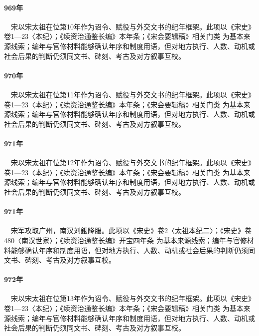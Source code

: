 \paragraph{969年}　宋以宋太祖在位第10年作为诏令、赋役与外交文书的纪年框架。此项以《宋史》卷1—23〈本纪〉；《续资治通鉴长编》本年条；《宋会要辑稿》相关门类 为基本来源线索；编年与官修材料能够确认年序和制度用语，但对地方执行、人数、动机或社会后果的判断仍须同文书、碑刻、考古及对方叙事互校。

\paragraph{970年}　宋以宋太祖在位第11年作为诏令、赋役与外交文书的纪年框架。此项以《宋史》卷1—23〈本纪〉；《续资治通鉴长编》本年条；《宋会要辑稿》相关门类 为基本来源线索；编年与官修材料能够确认年序和制度用语，但对地方执行、人数、动机或社会后果的判断仍须同文书、碑刻、考古及对方叙事互校。

\paragraph{971年}　宋以宋太祖在位第12年作为诏令、赋役与外交文书的纪年框架。此项以《宋史》卷1—23〈本纪〉；《续资治通鉴长编》本年条；《宋会要辑稿》相关门类 为基本来源线索；编年与官修材料能够确认年序和制度用语，但对地方执行、人数、动机或社会后果的判断仍须同文书、碑刻、考古及对方叙事互校。

\paragraph{971年}　宋军攻取广州，南汉刘鋹降服。此项以《宋史》卷2〈太祖本纪二〉；《宋史》卷480〈南汉世家〉；《续资治通鉴长编》开宝四年条 为基本来源线索；编年与官修材料能够确认年序和制度用语，但对地方执行、人数、动机或社会后果的判断仍须同文书、碑刻、考古及对方叙事互校。

\paragraph{972年}　宋以宋太祖在位第13年作为诏令、赋役与外交文书的纪年框架。此项以《宋史》卷1—23〈本纪〉；《续资治通鉴长编》本年条；《宋会要辑稿》相关门类 为基本来源线索；编年与官修材料能够确认年序和制度用语，但对地方执行、人数、动机或社会后果的判断仍须同文书、碑刻、考古及对方叙事互校。

